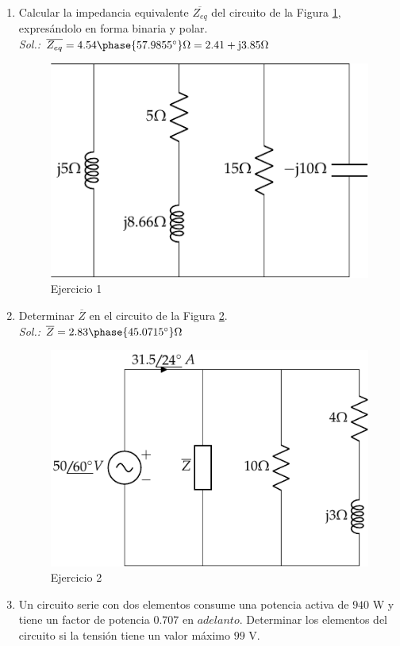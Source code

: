 \documentclass[11pt]{book} %
\begin{document}
	\begin{enumerate}
		
\item Calcular la impedancia equivalente $\overline{Z_{eq}}$ del circuito de la Figura \ref{fig.ej_CA1}, expresándolo en forma binaria y polar.\\
\emph{Sol.: $\overline{Z_{eq}}=4.54\phase{57.9855^\circ}\Omega=2.41+\mathrm{j}3.85\Omega$}
 \begin{figure}[H]
        \centering
        \includegraphics{../figs/ej1_BT2.pdf}
        \caption{Ejercicio 1}
        \label{fig.ej_CA1}
    \end{figure}
    \item Determinar $\overline{Z}$ en el circuito de la Figura \ref{fig.ej_CA2}.\\
    \emph{Sol.: $\overline{Z}=2.83\phase{45.0715^\circ}\Omega$}
     \begin{figure}[h!]
        \centering
        \includegraphics[width=0.5\linewidth]{../figs/ej2_BT2.pdf}
        \caption{Ejercicio 2}
        \label{fig.ej_CA2}
    \end{figure}
    \item Un circuito serie con dos elementos consume una potencia activa de $940$ W y tiene un factor de potencia $0.707$ en $adelanto$. Determinar los elementos del circuito si la tensión tiene un valor máximo $99$ V. \\

\end{enumerate}
\end{document}
